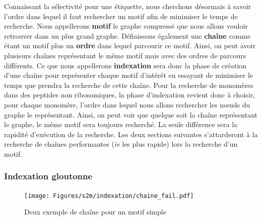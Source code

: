\label{index_p}

Connaissant la sélectivité pour une étiquette, nous cherchons désormais à savoir l'ordre dans lequel il faut rechercher un motif afin de minimiser le temps de recherche.
Nous appellerons \textbf{motif} le graphe compressé que nous allons vouloir retrouver dans un plus
grand graphe. Définissons également une \textbf{chaîne} comme étant un motif plus un \textbf{ordre} dans lequel parcourir ce motif.
Ainsi, on peut avoir plusieurs chaînes représentant le même motif mais avec des ordres de parcours différents.
Ce que nous appellerons \textbf{indexation} sera donc la phase de création d'une chaîne pour représenter chaque motif d'intérêt en essayant de minimiser le temps que prendra la recherche de cette chaîne.
Pour la recherche de monomères dans des peptides non ribosomiques, la phase d'indexation revient donc à choisir, pour chaque monomère, l'ordre dans lequel nous allons rechercher les n\oe{}uds du graphe le représentant.
Ainsi, on peut voir que quelque soit la chaîne représentant le graphe, le même motif sera toujours recherché.
La seule différence sera la rapidité d'exécution de la recherche.
Les deux sections suivantes s'attarderont à la recherche de chaînes performantes (\textit{ie} les plus rapide) lors la recherche d'un motif.


\subsubsection{Indexation gloutonne}

\begin{figure}[!ht]
  \texttt{[image: Figures/s2m/indexation/chaine\_fail.pdf]}
  \caption{\label{chaine_fail}Deux exemple de chaîne pour un motif simple}
\end{figure}

